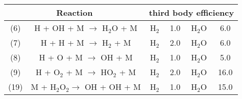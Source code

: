 \documentclass{warpdoc}
\renewcommand{\fontsizetable}{\footnotesize\scalefont{0.9}}
\begin{document}
%
%
\begin{table}[t]
\fontsizetable
\begin{center}
\begin{threeparttable}
\begin{tabular}{cccccc} 
\toprule
\multicolumn{2}{c}{Reaction} & \multicolumn{4}{c}{third body efficiency} \\ 
\midrule
(6) & H + OH + M $\rightarrow$ H$_{2}$O + M & H$_{2}$ & 1.0 & H$_{2}$O & 6.0 \\
(7) & H + H + M $\rightarrow$ H$_{2}$ + M & H$_{2}$ & 2.0 & H$_{2}$O & 6.0 \\
(8) & H + O + M $\rightarrow$ OH + M & H$_{2}$ & 1.0 & H$_{2}$O & 5.0 \\
(9) & H + O$_{2}$ + M $\rightarrow$ HO$_{2}$ + M & H$_{2}$ & 2.0 & H$_{2}$O & 16.0 \\
(19) & M + H$_{2}$O$_{2} \rightarrow$ OH + OH + M & H$_{2}$ & 1.0 & H$_{2}$O & 15.0 \\
\bottomrule
\end{tabular}
\label{tab:jachimowsky-thirdbody}
\end{threeparttable}
\end{center}
\end{table}
%
\end{document}
